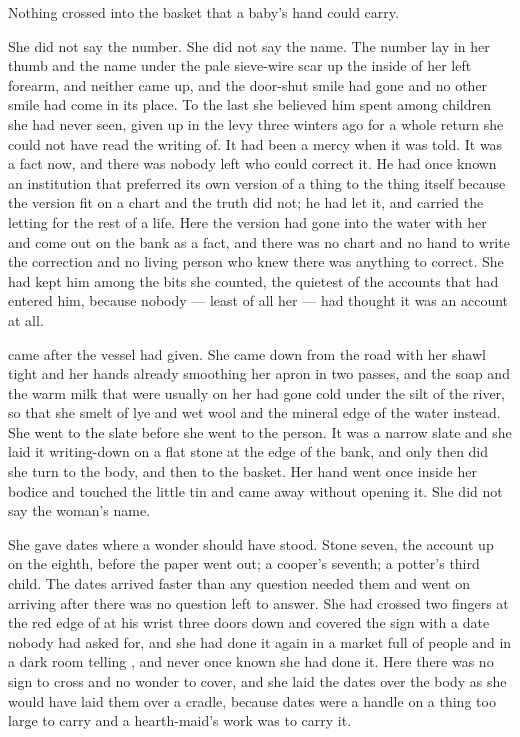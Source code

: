 Nothing crossed into the basket that a baby's hand could carry.

She did not say the number. She did not say the name. The number lay in her thumb and the name under the pale sieve-wire scar up the inside of her left forearm, and neither came up, and the door-shut smile had gone and no other smile had come in its place. To the last she believed him spent among children she had never seen, given up in the levy three winters ago for a whole return she could not have read the writing of. It had been a mercy when it was told. It was a fact now, and there was nobody left who could correct it. He had once known an institution that preferred its own version of a thing to the thing itself because the version fit on a chart and the truth did not; he had let it, and carried the letting for the rest of a life. Here the version had gone into the water with her and come out on the bank as a fact, and there was no chart and no hand to write the correction and no living person who knew there was anything to correct. She had kept him among the bits she counted, the quietest of the accounts that had entered him, because nobody --- least of all her --- had thought it was an account at all.

 came after the vessel had given. She came down from the road with her shawl tight and her hands already smoothing her apron in two passes, and the soap and the warm milk that were usually on her had gone cold under the silt of the river, so that she smelt of lye and wet wool and the mineral edge of the water instead. She went to the slate before she went to the person. It was a narrow slate and she laid it writing-down on a flat stone at the edge of the bank, and only then did she turn to the body, and then to the basket. Her hand went once inside her bodice and touched the little tin and came away without opening it. She did not say the woman's name.

She gave dates where a wonder should have stood. Stone seven, the account up on the eighth, before the paper went out; a cooper's seventh; a potter's third child. The dates arrived faster than any question needed them and went on arriving after there was no question left to answer. She had crossed two fingers at the red edge of  at his wrist three doors down and covered the sign with a date nobody had asked for, and she had done it again in a market full of people and in a dark room telling , and never once known she had done it. Here there was no sign to cross and no wonder to cover, and she laid the dates over the body as she would have laid them over a cradle, because dates were a handle on a thing too large to carry and a hearth-maid's work was to carry it.

